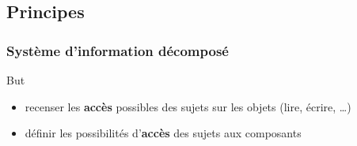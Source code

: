 


  
\usepackage{ifthen}


\def\txthl#1{ \ifthenelse{\lengthtest{#1 pt<0.5pt}}{\top}{\bot} }



\begin{reveals}
		
\maketitle


\section{Principes}

\begin{frame}
  \frametitle{Système d'information décomposé}


        

  \vfill

  \begin{block}{But}
    \begin{itemize}
    \item recenser les \textbf{accès} possibles des sujets sur les
      objets (lire, écrire, \ldots)
    \item définir les possibilités d'\textbf{accès} des sujets aux
      composants
    \end{itemize}
  \end{block}


\end{frame}
\end{reveals}
